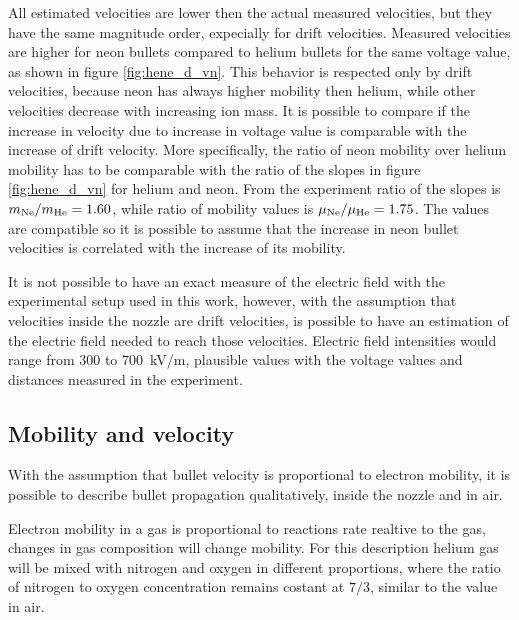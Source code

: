  
All estimated velocities are lower then the actual measured velocities, but they have the same magnitude order, expecially for drift velocities.
Measured velocities are higher for neon bullets compared to helium bullets for the same voltage value, as shown in figure \ref{fig:hene_d_vn}. This behavior is respected only by drift velocities, because neon has always higher mobility then helium, while other velocities decrease with increasing ion mass.
It is possible to compare if the increase in velocity due to increase in voltage value is comparable with the increase of drift velocity. More specifically, the ratio of neon mobility over helium mobility has to be comparable with the ratio of the slopes in figure \ref{fig:hene_d_vn} for helium and neon. From the experiment ratio of the slopes is $m_{\ce{Ne}}/m_{\ce{He}} = \num{1.60}$, while ratio of mobility values is $\mu_{\ce{Ne}}/\mu_{\ce{He}} = \num{1.75}$. The values are compatible so it is possible to assume that the increase in neon bullet velocities is correlated with the increase of its mobility.

It is not possible to have an exact measure of the electric field with the experimental setup used in this work, however, with the assumption that velocities inside the nozzle are drift velocities, is possible to have an estimation of the electric field needed to reach those velocities. Electric field intensities would range from \num{300} to \SI{700}{\kilo\volt/\meter}, plausible values with the voltage values and distances measured in the experiment.

\subsection{Mobility and velocity}
With the assumption that bullet velocity is proportional to electron mobility, it is possible to describe bullet propagation qualitatively, inside the nozzle and in air.

Electron mobility in a gas is proportional to reactions rate realtive to the gas, changes in gas composition will change mobility. For this description helium gas will be mixed with nitrogen and oxygen in different proportions, where the ratio of nitrogen to oxygen concentration remains costant at $7/3$, similar to the value in air.

